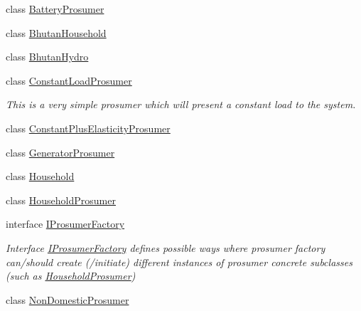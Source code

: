 \begin{DoxyCompactItemize}
\item 
class \hyperlink{classuk_1_1ac_1_1dmu_1_1iesd_1_1cascade_1_1agents_1_1prosumers_1_1_battery_prosumer}{Battery\-Prosumer}
\item 
class \hyperlink{classuk_1_1ac_1_1dmu_1_1iesd_1_1cascade_1_1agents_1_1prosumers_1_1_bhutan_household}{Bhutan\-Household}
\item 
class \hyperlink{classuk_1_1ac_1_1dmu_1_1iesd_1_1cascade_1_1agents_1_1prosumers_1_1_bhutan_hydro}{Bhutan\-Hydro}
\item 
class \hyperlink{classuk_1_1ac_1_1dmu_1_1iesd_1_1cascade_1_1agents_1_1prosumers_1_1_constant_load_prosumer}{Constant\-Load\-Prosumer}
\begin{DoxyCompactList}\small\item\em This is a very simple prosumer which will present a constant load to the system. \end{DoxyCompactList}\item 
class \hyperlink{classuk_1_1ac_1_1dmu_1_1iesd_1_1cascade_1_1agents_1_1prosumers_1_1_constant_plus_elasticity_prosumer}{Constant\-Plus\-Elasticity\-Prosumer}
\item 
class \hyperlink{classuk_1_1ac_1_1dmu_1_1iesd_1_1cascade_1_1agents_1_1prosumers_1_1_generator_prosumer}{Generator\-Prosumer}
\item 
class \hyperlink{classuk_1_1ac_1_1dmu_1_1iesd_1_1cascade_1_1agents_1_1prosumers_1_1_household}{Household}
\item 
class \hyperlink{classuk_1_1ac_1_1dmu_1_1iesd_1_1cascade_1_1agents_1_1prosumers_1_1_household_prosumer}{Household\-Prosumer}
\item 
interface \hyperlink{interfaceuk_1_1ac_1_1dmu_1_1iesd_1_1cascade_1_1agents_1_1prosumers_1_1_i_prosumer_factory}{I\-Prosumer\-Factory}
\begin{DoxyCompactList}\small\item\em Interface \hyperlink{interfaceuk_1_1ac_1_1dmu_1_1iesd_1_1cascade_1_1agents_1_1prosumers_1_1_i_prosumer_factory}{I\-Prosumer\-Factory} defines possible ways where prosumer factory can/should create (/initiate) different instances of prosumer concrete subclasses (such as {\ttfamily \hyperlink{classuk_1_1ac_1_1dmu_1_1iesd_1_1cascade_1_1agents_1_1prosumers_1_1_household_prosumer}{Household\-Prosumer}}) \end{DoxyCompactList}\item 
class \hyperlink{classuk_1_1ac_1_1dmu_1_1iesd_1_1cascade_1_1agents_1_1prosumers_1_1_non_domestic_prosumer}{Non\-Domestic\-Prosumer}

\end{DoxyCompactItemize}
